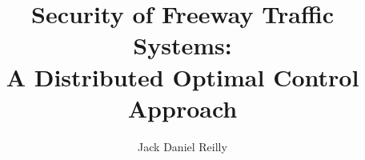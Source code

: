 \title{Security of Freeway Traffic Systems:\\A Distributed Optimal Control Approach}

\author{Jack Daniel Reilly}





\prevdegrees{}



\maketitle

\copyrightpage

\begin{abstract}

\end{abstract}

\begin{frontmatter}
\renewcommand{\thepage}{\roman{page}}
\setcounter{page}{1}

\begin{dedication}
\null\vfil
{\large
\begin{center}

\end{center}}
\null\vfil
\end{dedication}

\tableofcontents
\listoffigures
\listoftables

\begin{acknowledgements}

\end{acknowledgements}

\clearpage

\end{frontmatter}